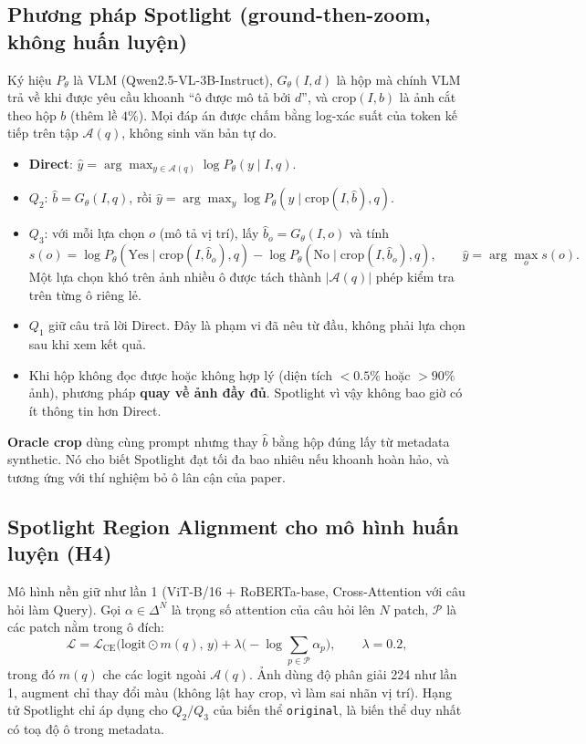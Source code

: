 \documentclass[12pt]{ai_conquer2026}
\begin{document}
\subsection{Phương pháp Spotlight (ground-then-zoom, không huấn luyện)}

Ký hiệu $P_\theta$ là VLM (Qwen2.5-VL-3B-Instruct), $G_\theta(I, d)$ là hộp mà chính VLM trả về khi được yêu cầu khoanh ``ô được mô tả bởi $d$'', và $\mathrm{crop}(I,b)$ là ảnh cắt theo hộp $b$ (thêm lề $4\%$). Mọi đáp án được chấm bằng log-xác suất của token kế tiếp trên tập $\mathcal{A}(q)$, không sinh văn bản tự do.
\begin{itemize}
    \item \textbf{Direct}: $\hat y = \arg\max_{y \in \mathcal{A}(q)} \log P_\theta(y \mid I, q)$.
    \item \textbf{$Q_2$}: $\hat b = G_\theta(I, q)$, rồi $\hat y = \arg\max_{y} \log P_\theta(y \mid \mathrm{crop}(I,\hat b), q)$.
    \item \textbf{$Q_3$}: với mỗi lựa chọn $o$ (mô tả vị trí), lấy $\hat b_o = G_\theta(I, o)$ và tính
    \[
      s(o) = \log P_\theta(\text{Yes} \mid \mathrm{crop}(I,\hat b_o), q) - \log P_\theta(\text{No} \mid \mathrm{crop}(I,\hat b_o), q), \qquad \hat y = \arg\max_o s(o).
    \]
    Một lựa chọn khó trên ảnh nhiều ô được tách thành $|\mathcal{A}(q)|$ phép kiểm tra trên từng ô riêng lẻ.
    \item \textbf{$Q_1$} giữ câu trả lời Direct. Đây là phạm vi đã nêu từ đầu, không phải lựa chọn sau khi xem kết quả.
    \item Khi hộp không đọc được hoặc không hợp lý (diện tích $<0.5\%$ hoặc $>90\%$ ảnh), phương pháp \textbf{quay về ảnh đầy đủ}. Spotlight vì vậy không bao giờ có ít thông tin hơn Direct.
\end{itemize}
\textbf{Oracle crop} dùng cùng prompt nhưng thay $\hat b$ bằng hộp đúng lấy từ metadata synthetic. Nó cho biết Spotlight đạt tối đa bao nhiêu nếu khoanh hoàn hảo, và tương ứng với thí nghiệm bỏ ô lân cận của paper.

\subsection{Spotlight Region Alignment cho mô hình huấn luyện (H4)}

Mô hình nền giữ như lần 1 (ViT-B/16 + RoBERTa-base, Cross-Attention với câu hỏi làm Query). Gọi $\alpha \in \Delta^{N}$ là trọng số attention của câu hỏi lên $N$ patch, $\mathcal{P}$ là các patch nằm trong ô đích:
\[
  \mathcal{L} = \mathcal{L}_{\text{CE}}\big(\text{logit}\odot m(q),\, y\big) + \lambda\Big(-\log\sum_{p\in\mathcal{P}}\alpha_p\Big),\qquad \lambda = 0.2,
\]
trong đó $m(q)$ che các logit ngoài $\mathcal{A}(q)$. Ảnh dùng độ phân giải 224 như lần 1, augment chỉ thay đổi màu (không lật hay crop, vì làm sai nhãn vị trí). Hạng tử Spotlight chỉ áp dụng cho $Q_2/Q_3$ của biến thể \texttt{original}, là biến thể duy nhất có toạ độ ô trong metadata.
\end{document}
